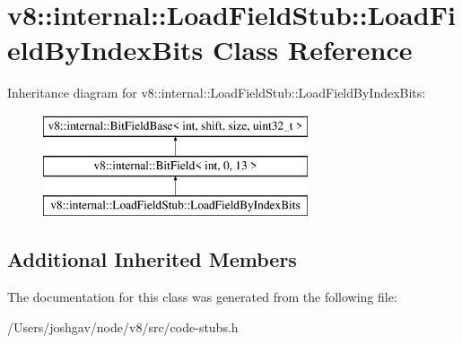 \hypertarget{classv8_1_1internal_1_1_load_field_stub_1_1_load_field_by_index_bits}{}\section{v8\+:\+:internal\+:\+:Load\+Field\+Stub\+:\+:Load\+Field\+By\+Index\+Bits Class Reference}
\label{classv8_1_1internal_1_1_load_field_stub_1_1_load_field_by_index_bits}
Inheritance diagram for v8\+:\+:internal\+:\+:Load\+Field\+Stub\+:\+:Load\+Field\+By\+Index\+Bits\+:\begin{figure}[H]
\begin{center}
\leavevmode
\includegraphics[height=3.000000cm]{classv8_1_1internal_1_1_load_field_stub_1_1_load_field_by_index_bits}
\end{center}
\end{figure}
\subsection*{Additional Inherited Members}


The documentation for this class was generated from the following file\+:\begin{DoxyCompactItemize}
\item 
/\+Users/joshgav/node/v8/src/code-\/stubs.\+h\end{DoxyCompactItemize}
